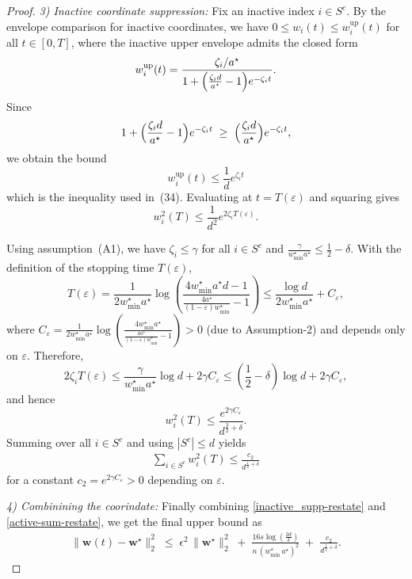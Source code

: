 \documentclass{article}
\theoremstyle{plain}
\theoremstyle{definition}
\theoremstyle{remark}
\begin{document}
{\begin{proof}
\textit{3) Inactive coordinate suppression:}
Fix an inactive index $i\in S^c$. By the envelope comparison for inactive coordinates, we have
$0\le w_i(t)\le w_i^{\mathrm{up}}(t)$ for all $t\in[0,T]$, where the inactive upper envelope admits the closed form
\[
w_i^{\mathrm{up}}(t)
=
\frac{\zeta_i/a^\star}{1+\Bigl(\frac{\zeta_i d}{a^\star}-1\Bigr)e^{-\zeta_i t}}.
\]
Since
\[
1+\Bigl(\frac{\zeta_i d}{a^\star}-1\Bigr)e^{-\zeta_i t}
\;\ge\;
\Bigl(\frac{\zeta_i d}{a^\star}\Bigr)e^{-\zeta_i t},
\]
we obtain the bound
\[
w_i^{\mathrm{up}}(t)
\le
\frac{1}{d}e^{\zeta_i t}
\]
which is the inequality used in~(34). Evaluating at $t=T(\varepsilon)$ and squaring gives
\[
w_i^2(T)
\le
\frac{1}{d^2}e^{2\zeta_i T(\varepsilon)}.
\]

Using assumption~(A1), we have $\zeta_i\le \gamma$ for all $i\in S^c$ and $\frac{\gamma}{w_{\min}^\star a^\star}\le \frac12-\delta$. With the definition of the stopping time $T(\varepsilon)$,
\[
T(\varepsilon)
=
\frac{1}{2w_{\min}^\star a^\star}
\log\!\left(
\frac{4w_{\min}^\star a^\star d-1}{\frac{4a^\star}{(1-\varepsilon)w_{\min}^\star}-1}
\right)
\le
\frac{\log d}{2w_{\min}^\star a^\star}+C_\varepsilon,
\]
where $C_\varepsilon=
\frac{1}{2 w_{\min}^\star a^\star}
\log\!\left(
\frac{4 w_{\min}^\star a^\star}
{\frac{4 a^\star}{(1-\varepsilon) w_{\min}^\star}-1}
\right)
>0$ (due to Assumption-2) and depends only on $\varepsilon$. Therefore,
\[
2\zeta_i T(\varepsilon)
\le
\frac{\gamma}{w_{\min}^\star a^\star}\log d + 2\gamma C_\varepsilon
\le
(\frac{1}{2}-\delta)\log d + 2 \gamma C_\varepsilon,
\]
and hence
\[
w_i^2(T)
\le
\frac{e^{2\gamma C_\varepsilon}}{d^{\frac{3}{2}+\delta}}.
\]
Summing over all $i\in S^c$ and using $|S^c|\le d$ yields
\begin{align}
\label{inactive_supp-restate}
    \sum_{i\in S^c} w_i^2(T)
\le
\frac{c_2}{d^{\frac{1}{2}+\delta}}
\end{align}
for a constant $c_2=e^{2\gamma C_\varepsilon}>0$ depending on $\varepsilon$.

\textit{4) Combinining the coorindate:} Finally combining \eqref{inactive_supp-restate} and \eqref{active-sum-restate}, we get the final upper bound as 
\begin{align}
\label{eq:spindly_l2_bound-restate}
\|\mathbf w(t)-\mathbf w^\star\|_2^2
\;\le\;
\epsilon^2\,\|\mathbf w^\star\|_2^2
\;+\;
\frac{16s\log (\frac{2d}{\delta})}{n\, (w_{\min}^\star\, a^\star)^2}
\;+\;
\frac{c_2}{d^{{\frac{1}{2}+\delta}}}.
\end{align}
\end{proof}


}
\end{document}
